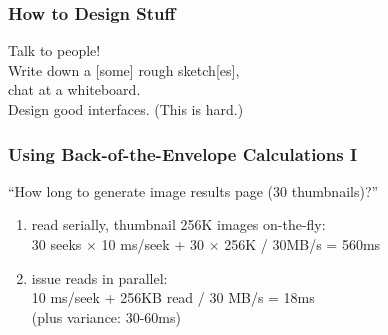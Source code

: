 \documentclass[aspectratio=43]{beamer}
\newenvironment{changemargin}[1]{%
  \begin{list}{}{%
    \setlength{\topsep}{0pt}%
    \setlength{\leftmargin}{#1}%
    \setlength{\rightmargin}{1em}
    \setlength{\listparindent}{\parindent}%
    \setlength{\itemindent}{\parindent}%
    \setlength{\parsep}{\parskip}%
  }%
  \item[]}{\end{list}}
\begin{document}
\begin{frame}
  \frametitle{How to Design Stuff}

  \begin{changemargin}{2cm}

    Talk to people!\\[1em]

    Write down a [some] rough sketch[es], \\ \qquad chat at a whiteboard.\\[1em]

    Design good interfaces. (This is hard.)

  \end{changemargin}
\end{frame}

\begin{frame}
  \frametitle{Using Back-of-the-Envelope Calculations I}

  \begin{changemargin}{2cm}
    ``How long to generate image results page (30 thumbnails)?''

    \begin{enumerate}
      \item read serially, thumbnail 256K images on-the-fly:\\
        30 seeks $\times$ 10 ms/seek + 30 $\times$ 256K / 30MB/s = 560ms

      \item issue reads in parallel:\\
        10 ms/seek + 256KB read / 30 MB/s = 18ms\\
        (plus variance: 30-60ms)
    \end{enumerate}
  \end{changemargin}
\end{frame}
\end{document}
